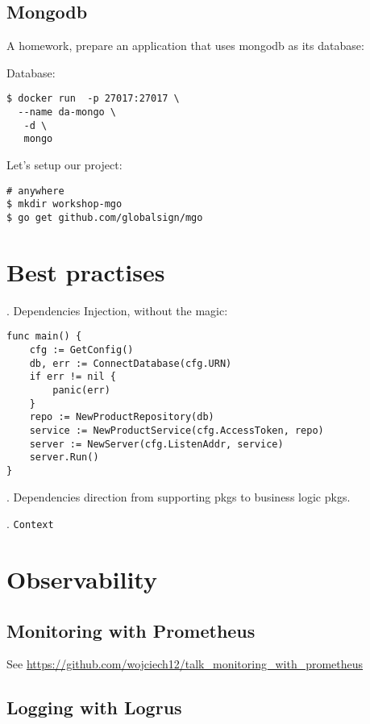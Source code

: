 \documentclass[11pt, letterpaper]{article}
\begin{document}
\subsection{Mongodb}

A homework, prepare an application that uses mongodb as its database:

Database:

\begin{verbatim}
$ docker run  -p 27017:27017 \
  --name da-mongo \
   -d \ 
   mongo
\end{verbatim}


Let's setup our project:

\begin{verbatim}
# anywhere 
$ mkdir workshop-mgo
$ go get github.com/globalsign/mgo
\end{verbatim}

\section{Best practises}

. Dependencies Injection, without the magic:

\begin{verbatim}
func main() {  
    cfg := GetConfig()
    db, err := ConnectDatabase(cfg.URN)
    if err != nil {
        panic(err)
    }
    repo := NewProductRepository(db)
    service := NewProductService(cfg.AccessToken, repo)
    server := NewServer(cfg.ListenAddr, service)
    server.Run()
}
\end{verbatim}

. Dependencies direction from supporting pkgs to business logic pkgs.

\bigskip
3. \verb|Context| 

\section{Observability}

\subsection{Monitoring with Prometheus}

See \href{https://github.com/wojciech12/talk_monitoring_with_prometheus}{https://github.com/wojciech12/talk\_monitoring\_with\_prometheus}

\subsection{Logging with Logrus}
\end{document}
